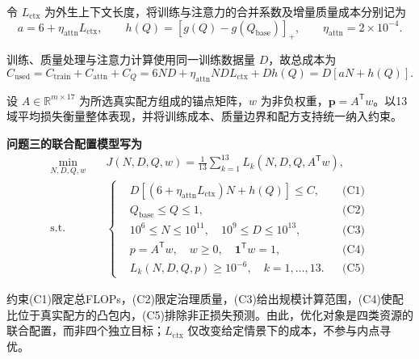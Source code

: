 \documentclass[bwprint]{gmcmthesis}
\begin{document}
令 $L_{\mathrm{ctx}}$ 为外生上下文长度，将训练与注意力的合并系数及增量质量成本分别记为
\begin{equation}\label{eq:q3_7}
    a=6+\eta_{\mathrm{attn}}L_{\mathrm{ctx}},\qquad
    h(Q)=[g(Q)-g(Q_{\mathrm{base}})]_+,\qquad
    \eta_{\mathrm{attn}}=2\times10^{-4}.
\end{equation}

训练、质量处理与注意力计算使用同一训练数据量 $D$，故总成本为
\begin{equation}\label{eq:q3_8}
    C_{\mathrm{used}}=C_{\mathrm{train}}+C_{\mathrm{attn}}+C_Q
    =6ND+\eta_{\mathrm{attn}}NDL_{\mathrm{ctx}}+Dh(Q)
    =D[aN+h(Q)].
\end{equation}

设 $A\in\mathbb R^{m\times17}$ 为所选真实配方组成的锚点矩阵，$w$ 为非负权重，$\mathbf p=A^{\mathsf T}w$。以13域平均损失衡量整体表现，并将训练成本、质量边界和配方支持统一纳入约束。

\begin{samepage}
    \noindent\textbf{问题三的联合配置模型写为}
    \begin{equation}\label{eq:q3_9}
        \begin{aligned}
            \min_{N,D,Q,w}\quad & J(N,D,Q,w)=\frac{1}{13}\sum_{k=1}^{13}L_k(N,D,Q,A^{\mathsf T}w), \\
            \mathrm{s.t.}\quad  & \left\{
            \begin{aligned}
                 & D\left[(6+\eta_{\mathrm{attn}}L_{\mathrm{ctx}})N+h(Q)\right]\le C, &  & \text{(C1)} \\
                 & Q_{\mathrm{base}}\le Q\le1,                                        &  & \text{(C2)} \\
                 & 10^6\le N\le10^{11},\quad 10^9\le D\le10^{13},                     &  & \text{(C3)} \\
                 & p=A^{\mathsf T}w,\quad w\ge0,\quad \mathbf1^{\mathsf T}w=1,        &  & \text{(C4)} \\
                 & L_k(N,D,Q,p)\ge10^{-6},\quad k=1,\ldots,13.                        &  & \text{(C5)}
            \end{aligned}\right.
        \end{aligned}
    \end{equation}
\end{samepage}

约束(C1)限定总FLOPs，(C2)限定治理质量，(C3)给出规模计算范围，(C4)使配比位于真实配方的凸包内，(C5)排除非正损失预测。由此，优化对象是四类资源的联合配置，而非四个独立目标；$L_{\mathrm{ctx}}$ 仅改变给定情景下的成本，不参与内点寻优。
\end{document}
